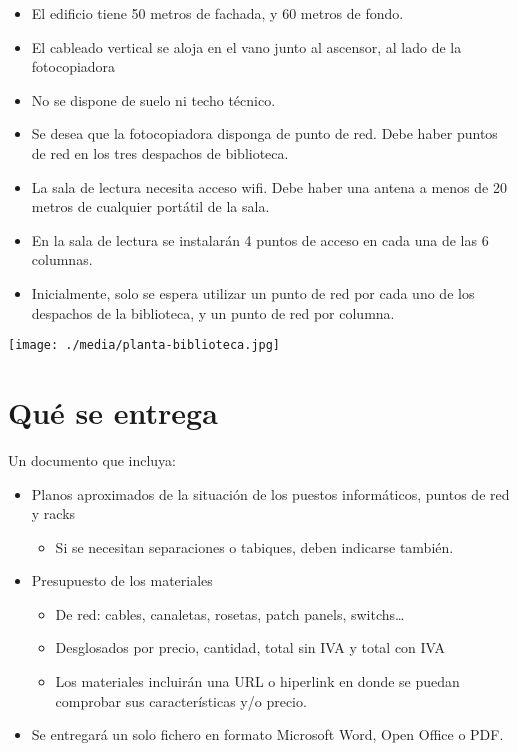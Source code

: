 \documentclass[a4paper]{article}
\renewcommand{\includegraphics}[2][]{\IfFileExists{#2.pdf}{\originalincludegraphics[#1]{#2.pdf}}{\originalincludegraphics[#1]{#2}}}
\begin{document}
\begin{itemize}
\item El edificio tiene 50 metros de fachada, y 60 metros de fondo.
\item El cableado vertical se aloja en el vano junto al ascensor, al lado de la fotocopiadora
\item No se dispone de suelo ni techo técnico.
\item Se desea que la fotocopiadora disponga de punto de red. Debe haber puntos de red en los tres despachos de biblioteca.
\item La sala de lectura necesita acceso wifi. Debe haber una antena a menos de 20 metros de cualquier portátil de la sala.
\item En la sala de lectura se instalarán 4 puntos de acceso en cada una de las 6 columnas.
\item Inicialmente, solo se espera utilizar un punto de red por cada uno de los despachos de la biblioteca, y un punto de red por columna.
\end{itemize}


\begin{center}
\texttt{[image: ./media/planta-biblioteca.jpg]}
\end{center}



\section{Qué se entrega}
\label{sec:org0000006}
Un documento que incluya:
\begin{itemize}
\item Planos aproximados de la situación de los puestos informáticos, puntos de red y racks
\begin{itemize}
\item Si se necesitan separaciones o tabiques, deben indicarse también.
\end{itemize}
\item Presupuesto de los materiales
\begin{itemize}
\item De red: cables, canaletas, rosetas, patch panels, switchs…
\item Desglosados por precio, cantidad, total sin IVA y total con IVA
\item Los materiales incluirán una URL o hiperlink en donde se puedan comprobar sus características y/o precio.
\end{itemize}
\item Se entregará un solo fichero en formato Microsoft Word, Open Office o PDF.
\end{itemize}
\end{document}

